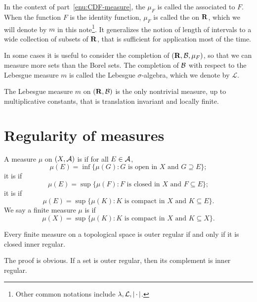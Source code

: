     In the context of part~\ref{enu:CDF-measure}, the $\mu_F$ is called the  associated to $F$. When the function $F$ is the identity function, $\mu_F$ is called the  on $\mathbf{R}$, which we will denote by $m$ in this note\footnote{Other common notations include $\lambda,\mathcal L,\lvert \,\cdot\, \rvert$.}. It generalizes the notion of length of intervals to a wide collection of subsets of $\mathbf{R}$, that is sufficient for application most of the time.
    
    In some cases it is useful to consider the completion of $(\mathbf{R},\mathcal{B},\mu_F)$, so that we can measure more sets than the Borel sets. The completion of $\mathcal{B}$ with respect to the Lebesgue measure $m$ is called the Lebesgue $\sigma$-algebra, which we denote by $\mathcal L$. 
    
\begin{thm}
    The Lebesgue measure $m$ on $(\mathbf{R},\mathcal{B})$ is the only nontrivial measure, up to multiplicative constants, that is translation invariant and locally finite.
\end{thm}

\section{Regularity of measures}
\begin{defn}
    A measure $\mu$ on $(X,\mathcal{A})$ is  if for all $E\in \mathcal{A}$, \[
        \mu(E) = \inf\{\mu(G): G\text{ is open in }X \text{ and } G\supseteq E\};
    \] it is  if \[
        \mu(E) = \sup\{\mu(F): F\text{ is closed in }X \text{ and } F\subseteq E\};
    \] it is  if \[
        \mu(E) = \sup\{\mu(K): K\text{ is compact in }X  \text{ and } K\subseteq E\}.\]
    We say a finite measure $\mu$ is  if \[
        \mu(X) = \sup\{\mu(K): K\text{ is compact in }X  \text{ and } K\subseteq X\}.
    \]
\end{defn}

\begin{prop}
    Every finite measure on a topological space is outer regular if and only if it is closed inner regular.
\end{prop}

The proof is obvious. If a set is outer regular, then its complement is inner regular.

